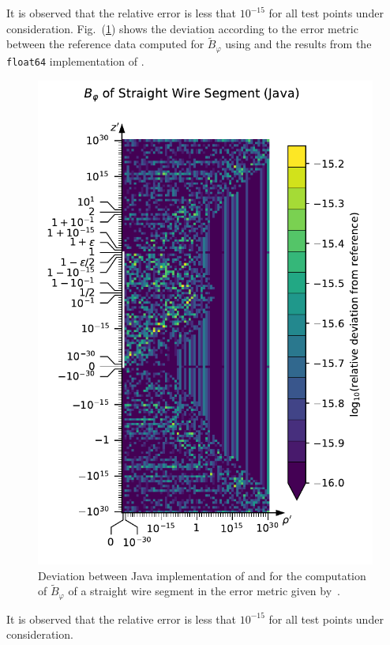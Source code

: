 It is observed that the relative error is less that $10^{-15}$ for all test points under consideration.
Fig.~(\ref{fig:StraightWireSegment_B_phi_Java}) shows the deviation
according to the error metric~
between the reference data computed for $\tilde{B}_\varphi$ using 
and the results from the \texttt{float64} implementation of .
\begin{figure}[htbp]
 \centering
 \includegraphics[height=0.8\textwidth]{img/StraightWireSegment_B_phi_Java.pdf}
 \caption{Deviation between Java implementation of  and 
          for the computation of $\tilde{B}_\varphi$ of a straight wire segment
          in the error metric given by~.}
 \label{fig:StraightWireSegment_B_phi_Java}
\end{figure}
It is observed that the relative error is less that $10^{-15}$ for all test points under consideration.

